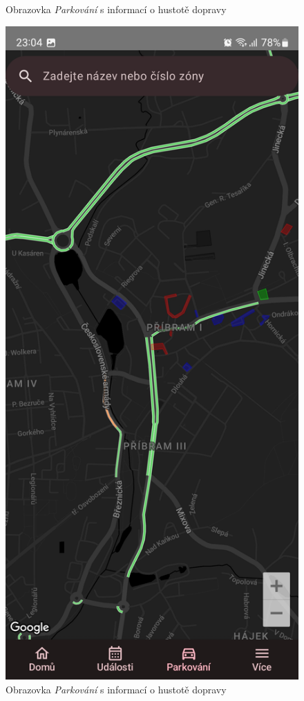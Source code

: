 \begin{figure}[H]
  \caption{Obrazovka \textit{Parkování} s informací o hustotě dopravy}
\endminipage\hfill
{}
  \includegraphics[width=\linewidth]{screens/3a_B.jpg}
  \caption{Obrazovka \textit{Parkování} s informací o hustotě dopravy}
\endminipage\hfill
\end{figure}

